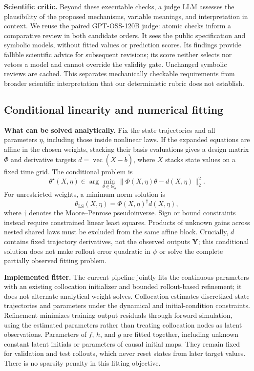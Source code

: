 \textbf{Scientific critic.} Beyond these executable checks, a judge LLM
assesses the plausibility of the proposed mechanisms, variable meanings,
and interpretation in context. We reuse the paired GPT-OSS-120B judge:
atomic checks inform a comparative review in both candidate orders.
It sees the public specification and symbolic models, without fitted
values or prediction scores. Its findings provide fallible scientific
advice for subsequent revisions; its score neither selects nor vetoes
a model and cannot override the validity gate. Unchanged symbolic
reviews are cached. This separates mechanically checkable requirements
from broader scientific interpretation that our deterministic rubric
does not establish.

\subsection{Conditional linearity and numerical fitting}

\textbf{What can be solved analytically.} Fix the state trajectories and
all parameters $\eta$, including those inside nonlinear laws. If the
expanded equations are affine in the chosen weights, stacking their
basis evaluations gives a design matrix $\Phi$ and derivative targets
$d=\operatorname{vec}(\dot X-b)$, where $X$ stacks state values on a
fixed time grid. The conditional problem is
\begin{equation}
 \theta^\star(X,\eta)\in
 \arg\min_{\theta\in\Theta_\theta}
 \|\Phi(X,\eta)\theta-d(X,\eta)\|_2^2.
 \label{eq:af-conditional-linear}
\end{equation}
For unrestricted weights, a minimum-norm solution is
\begin{equation}
 \theta_{\mathrm{LS}}(X,\eta)
 =\Phi(X,\eta)^\dagger d(X,\eta),
 \label{eq:af-conditional-solution}
\end{equation}
where $\dagger$ denotes the Moore--Penrose pseudoinverse.
Sign or bound constraints instead require constrained linear least
squares. Products of unknown gains across nested shared laws must be
excluded from the same affine block. Crucially, $d$ contains fixed
trajectory derivatives, not the observed outputs $\mathbf Y$;
this conditional solution does not make rollout error quadratic in
$\psi$ or solve the complete partially observed fitting problem.

\textbf{Implemented fitter.} The current pipeline jointly fits the
continuous parameters with an existing collocation initializer and
bounded rollout-based refinement; it does not alternate analytical
weight solves. Collocation estimates discretized state trajectories
and parameters under the dynamical and initial-condition constraints.
Refinement minimizes training output residuals through forward
simulation, using the estimated parameters rather than treating
collocation nodes as latent observations. Parameters of $f$, $h$, and
$g$ are fitted together, including unknown constant latent initials or
parameters of causal initial maps. They remain fixed for validation
and test rollouts, which never reset states from later target values.
There is no sparsity penalty in this fitting objective.

